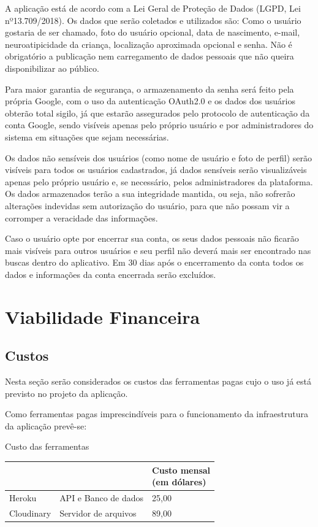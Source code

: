 A aplicação está de acordo com a Lei Geral de Proteção de Dados (LGPD, Lei nº13.709/2018). Os dados que serão coletados e utilizados são: Como o usuário gostaria de ser chamado, foto do usuário opcional, data de nascimento, e-mail, neuroatipicidade da criança, localização aproximada opcional e senha. Não é obrigatório a publicação nem carregamento de dados pessoais que não queira disponibilizar ao público. 

Para maior garantia de segurança, o armazenamento da senha será feito pela própria Google, com o uso da autenticação OAuth2.0 e os dados dos usuários obterão total sigilo, já que estarão assegurados pelo protocolo de autenticação da conta Google, sendo visíveis apenas pelo próprio usuário e por administradores do sistema em situações que sejam necessárias. 

Os dados não sensíveis dos usuários (como nome de usuário e foto de perfil) serão visíveis para todos os usuários cadastrados, já dados sensíveis serão visualizáveis apenas pelo próprio usuário e, se necessário, pelos administradores da plataforma. Os dados armazenados terão a sua integridade mantida, ou seja, não sofrerão alterações indevidas sem autorização do usuário, para que não possam vir a corromper a veracidade das informações. 

Caso o usuário opte por encerrar sua conta, os seus dados pessoais não ficarão mais visíveis para outros usuários e seu perfil não deverá mais ser encontrado nas buscas dentro do aplicativo. Em 30 dias após o encerramento da conta todos os dados e informações da conta encerrada serão excluídos. 

\section{Viabilidade Financeira}


\subsection{Custos}
Nesta seção serão considerados os custos das ferramentas pagas cujo o uso já está previsto no projeto da aplicação. 

Como ferramentas pagas imprescindíveis para o funcionamento da infraestrutura da aplicação prevê-se:

\begin{quadro}[htb]
	\centering
	\ABNTEXfontereduzida
	\caption[Custo das ferramentas]{Custo das ferramentas}
	\label{quadro-exemplo}
	\begin{tabular}{|p{4.0cm}|p{4.0cm}|p{3.0cm}|}
		\hline
		\thead{Ferramenta} & \thead{Uso}  & \thead{Custo mensal\\(em dólares)} \\
		\hline
		Heroku & API e Banco de dados  & 25,00  \\
		\hline
		Cloudinary & Servidor de arquivos &
		89,00 \\
		\hline
	\end{tabular}
\end{quadro}

